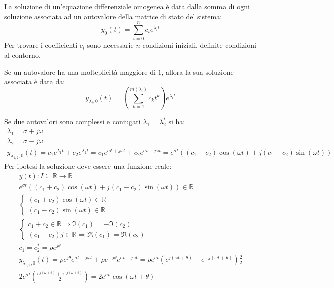 \documentclass{article}
\numberwithin{equation}{subsection}
\begin{document}
La soluzione di un'equazione differenziale omogenea è data dalla somma di ogni soluzione associata ad un autovalore della matrice di stato del sistema:
\begin{equation}
    y_0(t)=\displaystyle\sum_{i=0}^nc_ie^{\lambda_it}
\end{equation} 
Per trovare i coefficienti $c_i$ sono necessarie $n$-condizioni iniziali, definite condizioni al contorno. 

Se un autovalore ha una molteplicità maggiore di $1$, allora la sua soluzione associata è data da:
\begin{equation}
    y_{\lambda_i,0}(t)=\left(\displaystyle\sum_{k=1}^{m(\lambda_i)}c_kt^{k}\right)e^{\lambda_it}
\end{equation}

Se due autovalori sono complessi e coniugati $\lambda_1=\lambda_2^{*}$ si ha:
\begin{gather*}
    \lambda_1=\sigma+j\omega\\
    \lambda_2=\sigma-j\omega\\
    y_{\lambda_{1,2},0}(t)=c_1e^{\lambda_1t}+c_2e^{\lambda_2t}=c_1e^{\sigma t +j\omega t}+c_2e^{\sigma t-j\omega t}=e^{\sigma t}((c_1+c_2)\cos(\omega t)+j(c_1-c_2)\sin(\omega t))
\end{gather*}
Per ipotesi la soluzione deve essere una funzione reale: 
\begin{gather*}
    y(t):I\subseteq\mathbb{R}\to\mathbb{R}\\
    e^{\sigma t}((c_1+c_2)\cos(\omega t)+j(c_1-c_2)\sin(\omega t))\in\mathbb{R}\\
    \begin{cases}
        (c_1+c_2)\cos(\omega t)\in\mathbb{R}\\
        (c_1-c_2)\sin(\omega t)\in\mathbb{R}
    \end{cases}\\
    \begin{cases}
        c_1+c_2\in\mathbb{R}\Rightarrow \Im(c_1)=-\Im(c_2)\\
        (c_1-c_2)j\in\mathbb{R}\Rightarrow \Re(c_1)=\Re(c_2)
    \end{cases}\\
    c_1=c_2^*=\rho e^{j\theta}\\
    y_{\lambda_{1,2},0}(t)=\rho e^{j\theta}e^{\sigma t +j\omega t}+\rho e^{-j\theta}e^{\sigma t-j\omega t}=\rho e^{\sigma t}\left(e^{j(\omega t+\theta)}+e^{-j(\omega t+\theta)}\right)\displaystyle\frac{2}{2}\\
    2e^{\sigma t}\left(\displaystyle\frac{e^{j(\omega+\theta)}+e^{-j(\omega+\theta)}}{2}\right)=2e^{\sigma t}\cos(\omega t+\theta)
\end{gather*}
\end{document}
